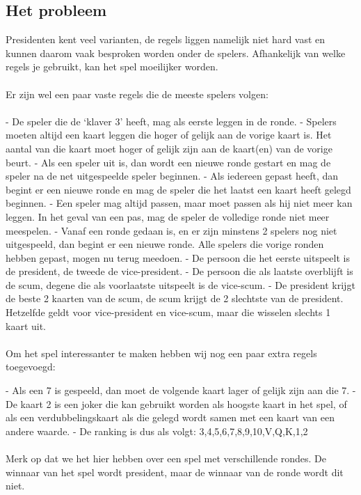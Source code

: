 \documentclass[11pt]{article}
\begin{document}
\subsection{Het probleem}
Presidenten kent veel varianten, de regels liggen namelijk niet hard vast en kunnen daarom vaak besproken worden onder de spelers. Afhankelijk van welke regels je gebruikt, kan het spel moeilijker worden. \\\\Er zijn wel een paar vaste regels die de meeste spelers volgen:\\\\
- De speler die de ‘klaver 3’ heeft, mag als eerste leggen in de ronde. 
- Spelers moeten altijd een kaart leggen die hoger of gelijk aan de vorige kaart is. Het aantal van die kaart moet hoger of gelijk zijn aan de kaart(en) van de vorige beurt.
- Als een speler uit is, dan wordt een nieuwe ronde gestart en mag de speler na de net uitgespeelde speler beginnen.
- Als iedereen gepast heeft, dan begint er een nieuwe ronde en mag de speler die het laatst een kaart heeft gelegd beginnen.
- Een speler mag altijd passen, maar moet passen als hij niet meer kan leggen. In het geval van een pas, mag de speler de volledige ronde niet meer meespelen.
- Vanaf een ronde gedaan is, en er zijn minstens 2 spelers nog niet uitgespeeld, dan begint er een nieuwe ronde. Alle spelers die vorige ronden hebben gepast, mogen nu terug meedoen.
- De persoon die het eerste uitspeelt is de president, de tweede de vice-president. 
- De persoon die als laatste overblijft is de scum, degene die als voorlaatste uitspeelt is de vice-scum.
- De president krijgt de beste 2 kaarten van de scum, de scum krijgt de 2 slechtste van de president. Hetzelfde geldt voor vice-president en vice-scum, maar die wisselen slechts 1 kaart uit.\\\\
Om het spel interessanter te maken hebben wij nog een paar extra regels toegevoegd:

- Als een 7 is gespeeld, dan moet de volgende kaart lager of gelijk zijn aan die 7.
- De kaart 2 is een joker die kan gebruikt worden als hoogste kaart in het spel, of als een verdubbelingskaart als die gelegd wordt samen met een kaart van een andere waarde.
- De ranking is dus als volgt: 3,4,5,6,7,8,9,10,V,Q,K,1,2
\\\\
Merk op dat we het hier hebben over een spel met verschillende rondes. De winnaar van het spel wordt president, maar de winnaar van de ronde wordt dit niet. 
\end{document}
